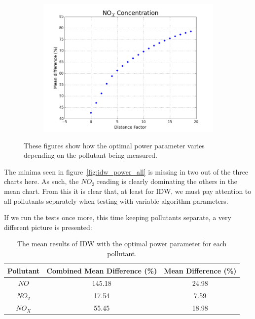 \begin{figure}[H]
\begin{subfigure}{0.6\textwidth}
                    \caption{}
                    \label{fig:idw_power_NO2}
                \end{subfigure}
                \begin{subfigure}{0.6\textwidth}
                    \centering
                    \includegraphics[width=\linewidth]{./images/IDW_P_NOx.png}
                    \caption{}
                    \label{fig:idw_power_NOx}
                \end{subfigure}
                \caption{These figures show how the optimal power parameter varies depending on the pollutant being measured.}
                \label{fig:idw_pollutant_compare}
            \end{figure}

            The minima seen in figure~\ref{fig:idw_power_all} is missing in two out of the three charts here. As such, the $NO_{2}$ reading is clearly dominating the others in the mean chart. From this it is clear that, at least for IDW, we must pay attention to all pollutants separately when testing with variable algorithm parameters. 

            If we run the tests once more, this time keeping pollutants separate, a very different picture is presented:

			\begin{table}[H]
				\centering
	    		\begin{tabular}{|c|c|c|}
	    			\hline
					Pollutant & Combined Mean Difference (\%) & Mean Difference (\%) \\ \hline
					$NO$ & 145.18 & 24.98 \\
					$NO_{2}$ & 17.54 & 7.59 \\
					$NO_{X}$ & 55.45 & 18.98 \\
					\hline
				\end{tabular}
				\caption{The mean results of IDW with the optimal power parameter for each pollutant.}
				\label{tab:idw_results_2}
			\end{table} 

